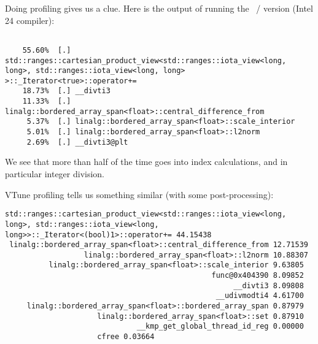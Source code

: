 Doing profiling gives us a clue.
Here is the output of running the ~/ 
version (Intel 24 compiler):
\begin{lstlisting}[language=verbatim]
%% make run_perf VARIANTS=span NSIZE=10000 ECHO=1  

    55.60%  [.] std::ranges::cartesian_product_view<std::ranges::iota_view<long, long>, std::ranges::iota_view<long, long> >::_Iterator<true>::operator+=
    18.73%  [.] __divti3
    11.33%  [.] linalg::bordered_array_span<float>::central_difference_from
     5.37%  [.] linalg::bordered_array_span<float>::scale_interior
     5.01%  [.] linalg::bordered_array_span<float>::l2norm
     2.69%  [.] __divti3@plt
\end{lstlisting}
We see that more than half of the time goes into index calculations,
and in particular integer division.

\begin{comment}
  This makes send if we consider our `diy' implementation:
  \cxxverbatimsnippet{d2ddiyiter}
  Unfortunately it's not the plus-plus operator but the plus-and-is,
  which is the bottlenect.
  For the former we can come up with trickery to lose the divisions:
  \cxxverbatimsnippet{d2ddiziter}
  for the latter that's much harder.
  (Note that the tricked code has no conditionals that could give branch mispredictions!)

  Unfortunately, \indexterm{perf} does not help us much here:
  \begin{lstlisting}[language=verbatim]
    35.25%  [.] linalg::bordered_array_diy2e<float>::l2norm
    31.39%  [.] linalg::bordered_array_diy2e<float>::central_difference_from
    30.46%  [.] linalg::bordered_array_diy2e<float>::scale_interior
    2.29%  [.] linalg::bordered_array_diy2e<float>::set
  \end{lstlisting}
  We get no timings for the embedded iterator.
  Note the counterintuitive result that the norm computation takes more time than the
  central difference,
  despite the latter having more operations
  and more complicated memory access.
\end{comment}

VTune profiling tells us something similar
(with some post-processing):
\begin{lstlisting}[language=verbatim]
std::ranges::cartesian_product_view<std::ranges::iota_view<long, long>, std::ranges::iota_view<long, long>>::_Iterator<(bool)1>::operator+= 44.15438
 linalg::bordered_array_span<float>::central_difference_from 12.71539
                  linalg::bordered_array_span<float>::l2norm 10.88307
          linalg::bordered_array_span<float>::scale_interior 9.63805
                                               func@0x404390 8.09852
                                                    __divti3 8.09808
                                                __udivmodti4 4.61700
     linalg::bordered_array_span<float>::bordered_array_span 0.87979
                     linalg::bordered_array_span<float>::set 0.87910
                              __kmp_get_global_thread_id_reg 0.00000
                     cfree 0.03664
\end{lstlisting}

